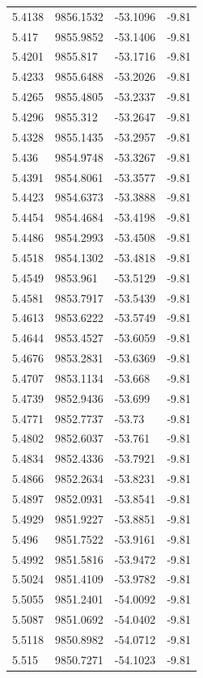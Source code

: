 \begin{table}[H]
\begin{tabular}{llll}
5.4138 & 9856.1532 & -53.1096 & -9.81 \\
5.417 & 9855.9852 & -53.1406 & -9.81 \\
5.4201 & 9855.817 & -53.1716 & -9.81 \\
5.4233 & 9855.6488 & -53.2026 & -9.81 \\
5.4265 & 9855.4805 & -53.2337 & -9.81 \\
5.4296 & 9855.312 & -53.2647 & -9.81 \\
5.4328 & 9855.1435 & -53.2957 & -9.81 \\
5.436 & 9854.9748 & -53.3267 & -9.81 \\
5.4391 & 9854.8061 & -53.3577 & -9.81 \\
5.4423 & 9854.6373 & -53.3888 & -9.81 \\
5.4454 & 9854.4684 & -53.4198 & -9.81 \\
5.4486 & 9854.2993 & -53.4508 & -9.81 \\
5.4518 & 9854.1302 & -53.4818 & -9.81 \\
5.4549 & 9853.961 & -53.5129 & -9.81 \\
5.4581 & 9853.7917 & -53.5439 & -9.81 \\
5.4613 & 9853.6222 & -53.5749 & -9.81 \\
5.4644 & 9853.4527 & -53.6059 & -9.81 \\
5.4676 & 9853.2831 & -53.6369 & -9.81 \\
5.4707 & 9853.1134 & -53.668 & -9.81 \\
5.4739 & 9852.9436 & -53.699 & -9.81 \\
5.4771 & 9852.7737 & -53.73 & -9.81 \\
5.4802 & 9852.6037 & -53.761 & -9.81 \\
5.4834 & 9852.4336 & -53.7921 & -9.81 \\
5.4866 & 9852.2634 & -53.8231 & -9.81 \\
5.4897 & 9852.0931 & -53.8541 & -9.81 \\
5.4929 & 9851.9227 & -53.8851 & -9.81 \\
5.496 & 9851.7522 & -53.9161 & -9.81 \\
5.4992 & 9851.5816 & -53.9472 & -9.81 \\
5.5024 & 9851.4109 & -53.9782 & -9.81 \\
5.5055 & 9851.2401 & -54.0092 & -9.81 \\
5.5087 & 9851.0692 & -54.0402 & -9.81 \\
5.5118 & 9850.8982 & -54.0712 & -9.81 \\
5.515 & 9850.7271 & -54.1023 & -9.81 \\

\end{tabular}
\end{table}
